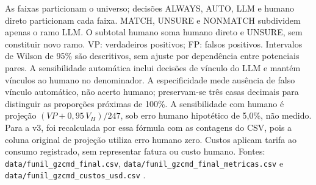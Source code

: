 \noindent\parbox{\linewidth}{\footnotesize As faixas particionam o universo; decisões ALWAYS, AUTO, LLM e humano direto particionam cada faixa. MATCH, UNSURE e NONMATCH subdividem apenas o ramo LLM. O subtotal humano soma humano direto e UNSURE, sem constituir novo ramo. VP: verdadeiros positivos; FP: falsos positivos. Intervalos de Wilson de 95\% são descritivos, sem ajuste por dependência entre potenciais pares. A sensibilidade automática inclui decisões de vínculo do LLM e mantém vínculos ao humano no denominador. A especificidade mede ausência de falso vínculo automático, não acerto humano; preservam-se três casas decimais para distinguir as proporções próximas de 100\%. A sensibilidade com humano é projeção $(VP+0{,}95\,V_H)/247$, sob erro humano hipotético de 5,0\%, não medido. Para a v3, foi recalculada por essa fórmula com as contagens do CSV, pois a coluna original de projeção utiliza erro humano zero. Custos aplicam tarifa ao consumo registrado, sem representar fatura ou custo humano. Fontes: \texttt{data/funil\_gzcmd\_final.csv}, \texttt{data/funil\_gzcmd\_final\_metricas.csv} e \texttt{data/funil\_gzcmd\_custos\_usd.csv} \cite{Jardim2026phdrepo}.}
\endgroup
